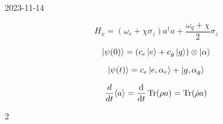 


2023-11-14

\[ H_x = \left( \omega_r + \chi \sigma_z \right) a^{\dagger} a + \frac{\omega_q +\chi}{2} \sigma_z \]


\[ \ket{\psi(0)} = \left( c_e \ket{e} + c_g \ket{g} \right) \otimes \ket{\alpha} \]

\[ \ket{\psi(t)} = c_e \ket{e, \alpha_{e}} + \ket{g, \alpha_g } \]

\[ \frac{d {}}{d {t}} {\expval a} = \dv{t} \Tr(\rho a) = \Tr (\dot \rho a)\]

2



